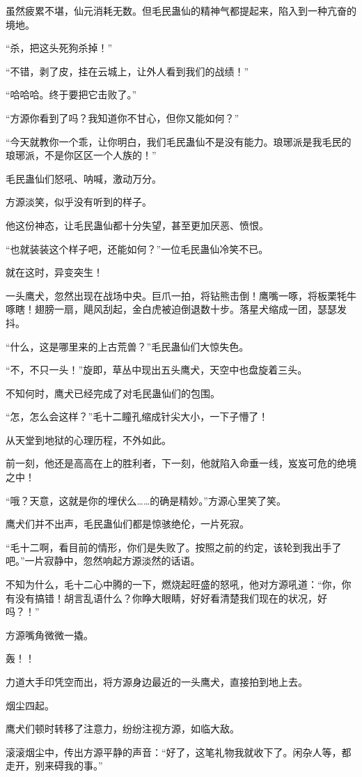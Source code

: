 \begin{this_body}
虽然疲累不堪，仙元消耗无数。但毛民蛊仙的精神气都提起来，陷入到一种亢奋的境地。

“杀，把这头死狗杀掉！”

“不错，剥了皮，挂在云城上，让外人看到我们的战绩！”

“哈哈哈。终于要把它击败了。”

“方源你看到了吗？我知道你不甘心，但你又能如何？”

“今天就教你一个乖，让你明白，我们毛民蛊仙不是没有能力。琅琊派是我毛民的琅琊派，不是你区区一个人族的！”

毛民蛊仙们怒吼、呐喊，激动万分。

方源淡笑，似乎没有听到的样子。

他这份神态，让毛民蛊仙都十分失望，甚至更加厌恶、愤恨。

“也就装装这个样子吧，还能如何？”一位毛民蛊仙冷笑不已。

就在这时，异变突生！

一头鹰犬，忽然出现在战场中央。巨爪一拍，将钻熊击倒！鹰嘴一啄，将板栗牦牛啄瞎！翅膀一扇，飓风刮起，金白虎被迫倒退数十步。落星犬缩成一团，瑟瑟发抖。

“什么，这是哪里来的上古荒兽？”毛民蛊仙们大惊失色。

“不，不只一头！”旋即，草丛中现出五头鹰犬，天空中也盘旋着三头。

不知何时，鹰犬已经完成了对毛民蛊仙们的包围。

“怎，怎么会这样？”毛十二瞳孔缩成针尖大小，一下子懵了！

从天堂到地狱的心理历程，不外如此。

前一刻，他还是高高在上的胜利者，下一刻，他就陷入命垂一线，岌岌可危的绝境之中！

“哦？天意，这就是你的埋伏么……的确是精妙。”方源心里笑了笑。

鹰犬们并不出声，毛民蛊仙们都是惊骇绝伦，一片死寂。

“毛十二啊，看目前的情形，你们是失败了。按照之前的约定，该轮到我出手了吧。”一片寂静中，忽然响起方源淡然的话语。

不知为什么，毛十二心中腾的一下，燃烧起旺盛的怒吼，他对方源吼道：“你，你有没有搞错！胡言乱语什么？你睁大眼睛，好好看清楚我们现在的状况，好吗？！”

方源嘴角微微一撬。

轰！！

力道大手印凭空而出，将方源身边最近的一头鹰犬，直接拍到地上去。

烟尘四起。

鹰犬们顿时转移了注意力，纷纷注视方源，如临大敌。

滚滚烟尘中，传出方源平静的声音：“好了，这笔礼物我就收下了。闲杂人等，都走开，别来碍我的事。”

\end{this_body}


